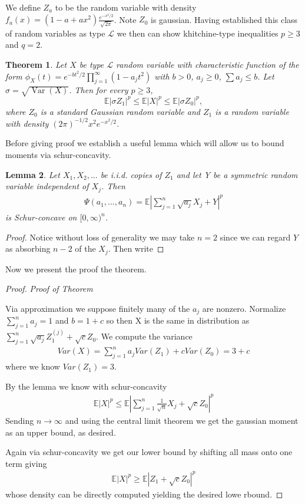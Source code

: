 \documentclass[10pt]{article}
\newcommand{\E}{\mathbb{E}}
\newcommand{\1}{\textbf{1}}
\DeclareMathOperator{\Var}{Var}
\newtheorem{theorem}{Theorem}
\newtheorem{lemma}[theorem]{Lemma}
\theoremstyle{remark}
\theoremstyle{definition}
\begin{document}
We define $Z_a$ to be the random variable with density $f_a(x) = (1-a+ax^2)\frac{e^{-x^2/2}}{\sqrt{2\pi}}$. Note $Z_0$ is gaussian. Having established this class of random variables as type $\mathcal{L}$ we then can show khitchine-type inequalities $p \geq 3$ and $q=2$. 

\begin{theorem}
Let $X$ be type $\mathcal{L}$ random variable with characteristic function of the form $\phi_X(t) = e^{-b t^2/2}\prod_{j=1}^\infty(1-a_jt^2)$ with $b > 0$, $a_j \geq 0$, $\sum a_j \leq b$. Let $\sigma = \sqrt{\Var(X)}$. Then for every $p \geq 3$, 
\[
\E|\sigma Z_1|^p \leq \E|X|^p \leq \E|\sigma Z_0|^p,\]
where $Z_0$ is a standard Gaussian random variable and $Z_1$ is a random variable with density $(2\pi)^{-1/2}x^2e^{-x^2/2}$.
\end{theorem}

Before giving proof we establish a useful lemma which will allow us to bound moments via schur-concavity.

\begin{lemma}
	Let $X_1,X_2,...$ be i.i.d. copies of $Z_1$ and let Y be a symmetric random variable independent of $X_j$. Then 
	\begin{align*}
		\Psi(a_1,...,a_n) = \E|\sum_{j=1}^n \sqrt{a_j}X_j + Y|^p
	\end{align*}
	is Schur-concave on $[0,\infty)^n$. 
\end{lemma}

\begin{proof}
	Notice without loss of generality we may take $n=2$ since we can regard $Y$ as absorbing $n-2$ of the $X_j$. Then write 

	
\end{proof}

Now we present the proof the theorem.

\begin{proof}\textit{Proof of Theorem}


	Via approximation we suppose finitely many of the $a_j$ are nonzero. Normalize $\sum_{j=1}^n a_j = 1$ and $b = 1+c$ so then X is the same in distribution as $\sum_{j=1}^n \sqrt{a_j}Z_1^{(j)} + \sqrt{c}Z_0$. We compute the variance
	\begin{align*}
		Var(X) = \sum_{j=1}^na_jVar(Z_1) + cVar(Z_0) = 3+c
	\end{align*}
	where we know $Var(Z_1) = 3$. 

	By the lemma we know with schur-concavity
	\begin{align*}
		\E |X|^p \leq \E|\sum_{j=1}^n \frac{1}{\sqrt{n}} X_j + \sqrt{c}Z_0|^p
	\end{align*}
	Sending $n \to \infty$ and using the central limit theorem we get the gaussian moment as an upper bound, as desired. 

	Again via schur-concavity we get our lower bound by shifting all mass onto one term giving
	\begin{align*}
		\E |X|^p \geq \E |Z_1 + \sqrt{c}Z_0|^p
	\end{align*}
	whose density can be directly computed yielding the desired lowe rbound.
\end{proof}
\end{document}

